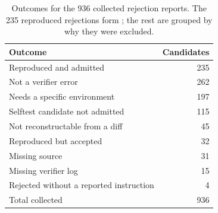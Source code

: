 \begin{table}[t]
  \centering
  \caption{Outcomes for the 936 collected rejection reports. The 235 reproduced rejections form \empiricalset; the rest are grouped by why they were excluded.}
  \label{tab:corpus-outcomes}
  \small
  \begin{tabular}{@{}l r@{}}
    \toprule
    Outcome & Candidates \\
    \midrule
    Reproduced and admitted              & 235 \\
    Not a verifier error                 & 262 \\
    Needs a specific environment         & 197 \\
    Selftest candidate not admitted      & 115 \\
    Not reconstructable from a diff      & 45  \\
    Reproduced but accepted              & 32  \\
    Missing source                       & 31  \\
    Missing verifier log                 & 15  \\
    Rejected without a reported instruction & 4 \\
    \midrule
    Total collected                      & 936 \\
    \bottomrule
  \end{tabular}
\end{table}
